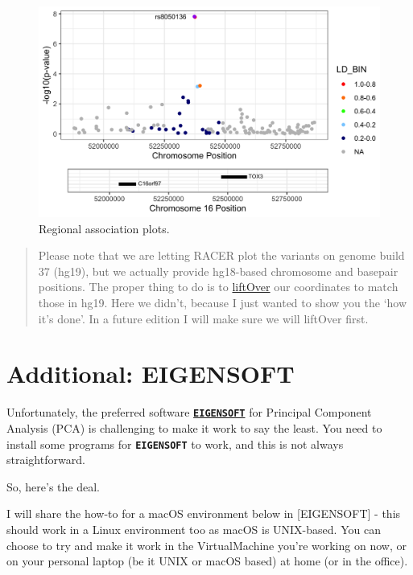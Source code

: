 \documentclass[
]{book}
\newcommand{\passthrough}[1]{#1}
\begin{document}
\begin{figure}

{\centering \includegraphics[width=25.25in]{img/rs8050136.rs8050136.regional_assoc} 

}

\caption{Regional association plots.}\label{fig:show-racer}
\end{figure}

\begin{quote}
Please note that we are letting RACER plot the variants on genome build 37 (hg19), but we actually provide hg18-based chromosome and basepair positions. The proper thing to do is to \href{https://genome.sph.umich.edu/wiki/LiftOver}{liftOver} our coordinates to match those in hg19. Here we didn't, because I just wanted to show you the `how it's done'. In a future edition I will make sure we will liftOver first.
\end{quote}

\hypertarget{eigensoft}{%
\chapter{Additional: EIGENSOFT}\label{eigensoft}}

Unfortunately, the preferred software \textbf{\href{https://github.com/DReichLab/EIG}{\passthrough{\lstinline!EIGENSOFT!}}} for Principal Component Analysis (PCA) is challenging to make it work to say the least. You need to install some programs for \textbf{\passthrough{\lstinline!EIGENSOFT!}} to work, and this is not always straightforward.

So, here's the deal.

I will share the how-to for a macOS environment below in {[}EIGENSOFT{]} - this should work in a Linux environment too as macOS is UNIX-based. You can choose to try and make it work in the VirtualMachine you're working on now, or on your personal laptop (be it UNIX or macOS based) at home (or in the office).
\end{document}
